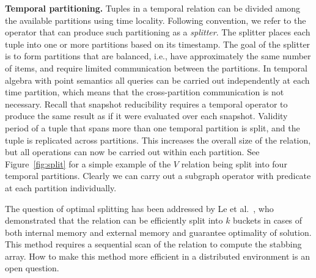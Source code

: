 {\bf Temporal partitioning.}  Tuples in a temporal relation can be
divided among the available partitions using time locality.  Following
convention, we refer to the operator that can produce such
partitioning as a {\em splitter}.  The splitter places each tuple into
one or more partitions based on its timestamp.  The goal of the
splitter is to form partitions that are balanced, i.e., have
approximately the same number of items, and require limited
communication between the partitions.  In temporal algebra with point
semantics all queries can be carried out independently at each time
partition, which means that the cross-partition communication is not
necessary.  Recall that snapshot reducibility requires a temporal
operator to produce the same result as if it were evaluated over each
snapshot.  Validity period of a tuple that spans more than one
temporal partition is split, and the tuple is replicated across
partitions.  This increases the overall size of the relation, but all
operations can now be carried out within each partition.  See
Figure~\ref{fig:split} for a simple example of the $V$ relation being
split into four temporal partitions.  Clearly we can carry out a
subgraph operator with predicate  at each
partition individually.

The question of optimal splitting has been addressed by Le et
al.~\cite{Le2013}, who demonstrated that the relation can be
efficiently split into $k$ buckets in cases of both internal memory
and external memory and guarantee optimality of solution.  This method requires a sequential scan of the relation to
compute the stabbing array.  How to make this method more efficient in
a distributed environment is an open question.


